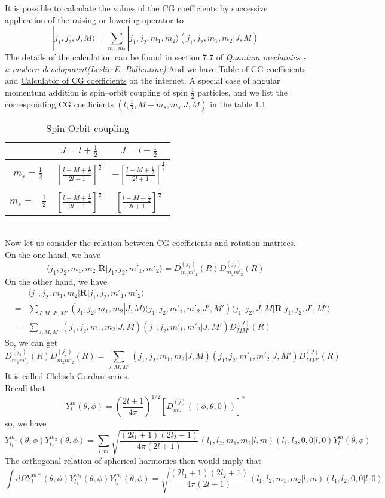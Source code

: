 It is possible to calculate the values of the CG coefficients by successive application of the raising or lowering operator to
\[|j_1,j_2,J,M\rangle = \sum_{m_1,m_2} |j_1,j_2,m_1,m_2\rangle (j_1,j_2,m_1,m_2|J,M)\]
The details of the calculation can be found in section 7.7 of \emph{Quantum mechanics - a modern development(Leslie E. Ballentine)}.And we have \href{https://en.wikipedia.org/wiki/Table_of_Clebsch-Gordan_coefficients}{Table of CG coefficients} and \href{http://www.wolframalpha.com/input/?i=CG+coefficient}{Calculator of CG coefficients} on the internet. A special case of angular momentum addition is spin–orbit coupling of spin $\frac{1}{2}$ particles, and we list the corresponding CG coefficients $(l,\frac{1}{2}, M-m_s, m_s|J,M)$ in the table 1.1.
\begin{table}[!th]
\centering
\begin{tabular}{|c|c|c|}
\hline
 & $J=l+\frac{1}{2}$ & $J=l-\frac{1}{2}$ \\
 \hline
 $m_s = \frac{1}{2}$ & $\left[ \frac{l+M+\frac{1}{2}}{2l+1}\right ]^{\frac{1}{2}} $ & $-\left[ \frac{l-M+\frac{1}{2}}{2l+1}\right ]^{\frac{1}{2}} $ \\
 \hline
 $m_s = -\frac{1}{2}$ & $\left[ \frac{l-M+\frac{1}{2}}{2l+1}\right ]^{\frac{1}{2}} $ & $\left[ \frac{l+M+\frac{1}{2}}{2l+1}\right ]^{\frac{1}{2}} $ \\
\hline
\end{tabular}
\caption{Spin-Orbit coupling}
\end{table}\\
Now let us consider the relation between CG coefficients and rotation matrices. On the one hand, we have
\[\langle j_1,j_2,m_1,m_2 | \bm{R} | j_1,j_2,m'_1,m'_2\rangle = D_{m_1m'_1}^{(j_1)}(R) D_{m_2m'_2}^{(j_2)}(R)\]
On the other hand, we have
\begin{eqnarray}
&\phantom{=}& \langle j_1,j_2,m_1,m_2 | \bm{R} | j_1,j_2,m'_1,m'_2\rangle \nonumber \\
&=& \sum_{J,M,J',M'} (j_1,j_2,m_1,m_2|J,M) (j_1,j_2,m'_1,m'_2|J',M')  \langle j_1,j_2,J,M | \bm{R} | j_1,j_2,J',M'\rangle \nonumber \\
&=& \sum_{J,M,M'} (j_1,j_2,m_1,m_2|J,M) (j_1,j_2,m'_1,m'_2|J,M')D_{MM'}^{(J)}(R) \nonumber
\end{eqnarray}
So, we can get
\[D_{m_1m'_1}^{(j_1)}(R) D_{m_2m'_2}^{(j_2)}(R) = \sum_{J,M,M'} (j_1,j_2,m_1,m_2|J,M) (j_1,j_2,m'_1,m'_2|J,M')D_{MM'}^{(J)}(R)\]
It is called Clebsch-Gordan series.\\
Recall that
\[Y_l^m(\theta,\phi) =  \left( \frac{2l+1}{4\pi} \right) ^{1/2} [D_{m0}^{(j)}((\phi,\theta,0))]^* \]
so, we have
\[Y_{l_1}^{m_1}(\theta,\phi) Y_{l_2}^{m_2}(\theta,\phi) = \sum_{l,m} \sqrt{\frac{(2l_1+1)(2l_2+1)}{4\pi(2l+1)}} (l_1,l_2,m_1,m_2|l,m) (l_1,l_2,0,0|l,0) Y_l^m(\theta,\phi)\]
The orthogonal relation of spherical harmonics then would imply that
\[\int d\Omega Y_l^{m*}(\theta,\phi)Y_{l_1}^{m_1}(\theta,\phi) Y_{l_2}^{m_2}(\theta,\phi) = \sqrt{\frac{(2l_1+1)(2l_2+1)}{4\pi(2l+1)}} (l_1,l_2,m_1,m_2|l,m) (l_1,l_2,0,0|l,0)\]

